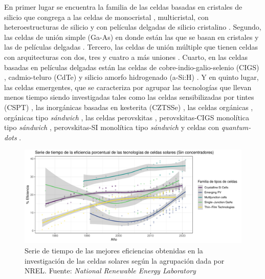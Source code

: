 En primer lugar se encuentra la familia de las celdas basadas en cristales de silicio que congrega a las celdas de monocristal \cite{gul2016}, multicristal\cite{moller2005multicrystalline}, con heteroestructuras de silicio \cite{sark2012introduction} y con películas delgadas de silicio cristalino \cite{brendel2011thin}. Segundo, las celdas de unión simple (Ga-As) en donde están las que se basan en cristales y las de películas delgadas \cite{konagai1978high}. Tercero, las celdas de unión múltiple que tienen celdas con arquitecturas con dos, tres y cuatro a más uniones \cite{dimroth2007high, philipps2018high}. Cuarto, en las celdas basadas en películas delgadas están las celdas de cobre-indio-galio-selenio (CIGS) \cite{wada2001high}, cadmio-teluro (CdTe) \cite{ferekides2004cdte} y silicio amorfo hidrogenado (a-Si:H) \cite{krvc2003analysis}. Y en quinto lugar, las celdas emergentes, que se caracteriza por agrupar las tecnologías que llevan menos tiempo siendo investigadas tales como las celdas sensibilizadas por tintes (CSPT) \cite{sharma2018dye}, las inorgánicas basadas en kesterita  (CZTSSe) \cite{suryawanshi2013czts}, las celdas orgánicas \cite{hoppe2004organic}, orgánicas tipo \textit{sándwich} \cite{ameri2009organic}, las celdas perovskitas \cite{jung2015perovskite}, perovskitas-CIGS monolítica tipo \textit{sándwich} \cite{li2020perovskite}, perovskitas-SI monolítica tipo \textit{sándwich} \cite{li2020perovskite} y celdas con \textit{quantum-dots} \cite{kim2022conformal}. 

\begin{figure}[h!]
    \begin{center}
        \includegraphics[scale=0.6]{img/familia_celdas.pdf}
    \end{center}
    \caption{Serie de tiempo de las mejores eficiencias obtenidas en la investigación de las celdas solares según la agrupación dada por NREL.
    Fuente: \textit{National Renewable Energy Laboratory} \cite{nrel}}
    \label{img:SerieTiempo}
\end{figure}

